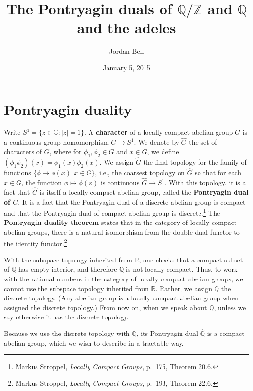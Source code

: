 \documentclass{article}
\theoremstyle{definition}
\theoremstyle{definition}
\begin{document}
\title{The Pontryagin duals of $\mathbb{Q}/\mathbb{Z}$ and $\mathbb{Q}$ and the adeles}
\author{Jordan Bell}
\date{January 5, 2015}

\maketitle



\section{Pontryagin duality}
Write $S^1=\{z \in \mathbb{C}: |z|=1\}$. 
A \textbf{character} of a locally compact abelian group $G$ is a continuous group homomorphism $G \to S^1$.
We denote by $\widehat{G}$ the set of characters of $G$, where for $\phi_1,\phi_2 \in \widehat{G}$ and $x \in G$,
we define $(\phi_1 \phi_2)(x)=\phi_1(x)\phi_2(x)$. We assign $\widehat{G}$ the final topology for the family of functions
$\{\phi \mapsto \phi(x): x \in G\}$, i.e., the coarsest topology on $\widehat{G}$ so that for each $x \in G$, the function $\phi \mapsto \phi(x)$ is continuous
$\widehat{G} \to S^1$. With this topology, it is a fact that $\widehat{G}$ is itself a locally compact abelian group, called  the \textbf{Pontryagin dual of $G$}.
It is a fact that the Pontryagin dual of a discrete abelian group is compact and that the Pontryagin dual of compact abelian group is discrete.\footnote{Markus Stroppel, {\em Locally Compact Groups},
p.~175, Theorem 20.6.}
The \textbf{Pontryagin duality theorem} states that in the category
of locally compact abelian groups, there is a natural
isomorphism from the double dual functor to the identity functor.\footnote{Markus Stroppel, {\em Locally Compact Groups},
p.~193, Theorem 22.6.}


With the subspace topology inherited from
$\mathbb{R}$, one checks that
a compact subset of $\mathbb{Q}$ has empty
interior, and therefore $\mathbb{Q}$ is not locally compact.
Thus, to work with the rational numbers in the category of locally compact abelian groups, we cannot use the subspace topology inherited from
$\mathbb{R}$. Rather, we assign $\mathbb{Q}$ the discrete topology. (Any abelian group is a locally compact abelian group when assigned the discrete
topology.) From now on, when we speak about $\mathbb{Q}$, unless we say otherwise it has the discrete topology.

Because we use the discrete topology with $\mathbb{Q}$, its Pontryagin
dual $\widehat{\mathbb{Q}}$ is a compact abelian group, which we wish to describe in a tractable way. 
\end{document}
